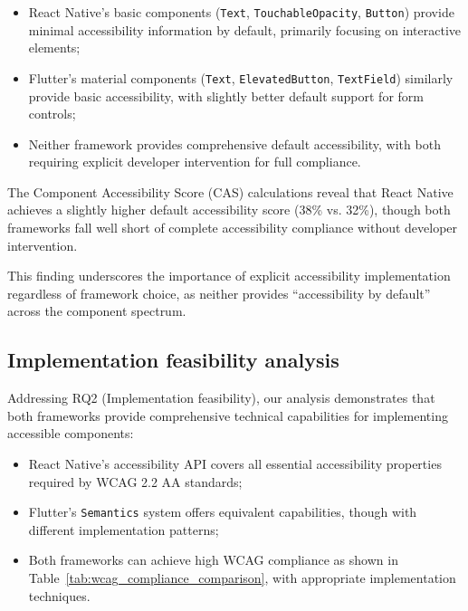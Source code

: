 \begin{itemize}
    \item React Native's basic components (\texttt{Text}, \texttt{TouchableOpacity}, \texttt{Button}) provide minimal accessibility information by default, primarily focusing on interactive elements;
    
    \item Flutter's material components (\texttt{Text}, \texttt{ElevatedButton}, \texttt{TextField}) similarly provide basic accessibility, with slightly better default support for form controls;
    
    \item Neither framework provides comprehensive default accessibility, with both requiring explicit developer intervention for full compliance.
\end{itemize}

The Component Accessibility Score (CAS) calculations reveal that React Native achieves a slightly higher default accessibility score (38\% vs. 32\%), though both frameworks fall well short of complete accessibility compliance without developer intervention.

This finding underscores the importance of explicit accessibility implementation regardless of framework choice, as neither provides ``accessibility by default'' across the component spectrum.

\subsection{Implementation feasibility analysis}
\label{subsec:implementation-feasibility}

Addressing RQ2 (Implementation feasibility), our analysis demonstrates that both frameworks provide comprehensive technical capabilities for implementing accessible components:

\begin{itemize}
    \item React Native's accessibility API covers all essential accessibility properties required by WCAG 2.2 AA standards;
    
    \item Flutter's \texttt{Semantics} system offers equivalent capabilities, though with different implementation patterns;
    
    \item Both frameworks can achieve high WCAG compliance as shown in Table~\ref{tab:wcag_compliance_comparison}, with appropriate implementation techniques.
\end{itemize}

